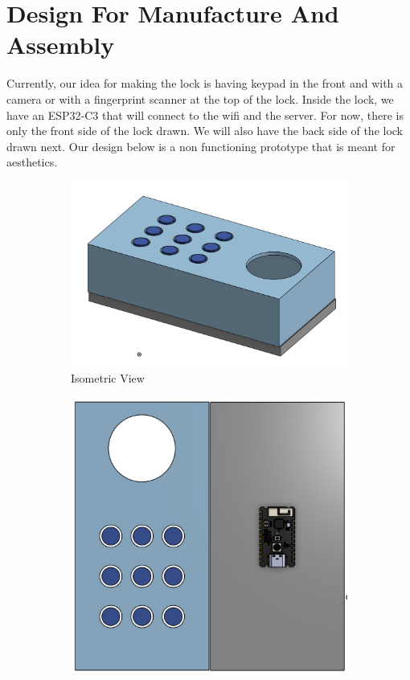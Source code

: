 \section{Design For Manufacture And Assembly}

Currently, our idea for making the lock is having keypad in the front and with a camera or with a fingerprint scanner at the top of the lock. Inside the lock, we have an ESP32-C3 that will connect to the wifi and the server. For now, there is only the front side of the lock drawn. We will also have the back side of the lock drawn next. Our design below is a non functioning prototype that is meant for aesthetics.

\begin{figure}[htbp]
    \centering
    \begin{subfigure}[b]{0.48\textwidth}
        \includegraphics[width=\textwidth]{./img/isoView.png}
        \caption{Isometric View}
        \label{fig:isoView}
    \end{subfigure}
    \hfill
    \begin{subfigure}[b]{0.48\textwidth}
        \includegraphics[width=\textwidth]{./img/topView.png}

\end{subfigure}
\end{figure}
